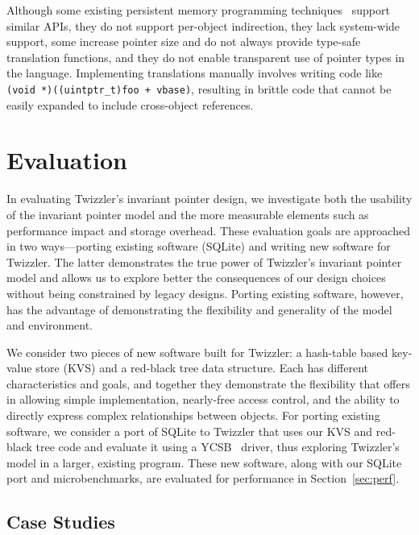 {    Although some existing persistent memory programming
    techniques~\cite{libpmem,Chen:micro17,wang:micro17} support similar
    APIs, they do not support per-object indirection, they lack system-wide support,
    some increase pointer size and do not always provide
    type-safe translation functions, and they do not enable transparent use of pointer
    types in the language. Implementing translations manually involves writing code
    like
    \texttt{(void *)((uintptr\_t)foo + vbase)}, resulting in brittle code that
    cannot be easily expanded to include cross-object references.

}

\section{Evaluation}

In evaluating Twizzler's invariant pointer design, we investigate both the
usability of the invariant pointer model and the more measurable elements such as performance impact
and storage overhead. These evaluation goals are approached in two ways---porting existing software
(SQLite) and writing new software for Twizzler. The latter demonstrates the true power of
Twizzler's invariant pointer model and allows us to explore better the consequences of our design
choices without being constrained by legacy designs. Porting existing software, however, has the
advantage of demonstrating the flexibility and generality of the model and environment.

We consider two pieces of new software built for Twizzler: a hash-table based key-value store (KVS) and a red-black tree
data structure.  Each has different characteristics and goals, and together they demonstrate the flexibility that
\Twizzler offers in allowing simple implementation, nearly-free access control, and the ability to directly express
complex relationships between objects.  For porting existing software, we consider a port of SQLite to Twizzler that
uses our KVS and red-black tree code and evaluate it using a YCSB~\cite{ycsb,ycsbc} driver, thus exploring Twizzler's
model in a larger, existing program. These new software, along with our SQLite port and
microbenchmarks, are evaluated for performance in Section~\ref{sec:perf}.


\subsection{Case Studies}

